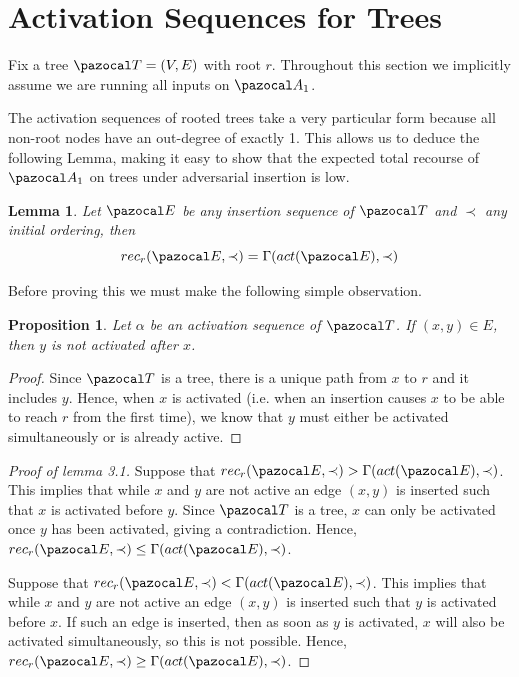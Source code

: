 \documentclass{report}
\newtheorem{lemma}[theorem]{Lemma}
\newtheorem{proposition}[theorem]{Proposition}
\begin{document}
\section{Activation Sequences for Trees}

Fix a tree $\pazocal T=(V,E)$ with root $r$. Throughout this section we implicitly assume we are running all inputs on $\pazocal A_1$.

The activation sequences of rooted trees take a very particular form because all non-root nodes have an out-degree of exactly 1. This allows us to deduce the following Lemma, making it easy to show that the expected total recourse of $\pazocal A_1$ on trees under adversarial insertion is low.

\begin{lemma}\label{gamma lemma 2}
Let $\pazocal E$ be any insertion sequence of $\pazocal T$ and $\prec$ any initial ordering, then
\[ rec_r(\pazocal E, \prec) = \Gamma(act(\pazocal E), \prec) \]
\end{lemma}

Before proving this we must make the following simple observation.

\begin{proposition}
Let $\alpha$ be an activation sequence of $\pazocal T$. If $(x,y) \in E$, then $y$ is not activated after $x$.
\end{proposition}

\begin{proof}
Since $\pazocal T$ is a tree, there is a unique path from $x$ to $r$ and it includes $y$. Hence, when $x$ is activated (i.e. when an insertion causes $x$ to be able to reach $r$ from the first time), we know that $y$ must either be activated simultaneously or is already active.
\end{proof}

\begin{proof}[Proof of lemma 3.1]
Suppose that $rec_r(\pazocal E, \prec) > \Gamma(act(\pazocal E), \prec)$. This implies that while $x$ and $y$ are not active an edge $(x,y)$ is inserted such that $x$ is activated before $y$. Since $\pazocal T$ is a tree, $x$ can only be activated once $y$ has been activated, giving a contradiction. Hence, $rec_r(\pazocal E, \prec) \leq \Gamma(act(\pazocal E), \prec)$.

Suppose that $rec_r(\pazocal E, \prec) < \Gamma(act(\pazocal E), \prec)$. This implies that while $x$ and $y$ are not active an edge $(x,y)$ is inserted such that $y$ is activated before $x$. If such an edge is inserted, then as soon as $y$ is activated, $x$ will also be activated simultaneously, so this is not possible. Hence, $rec_r(\pazocal E, \prec) \geq \Gamma(act(\pazocal E), \prec)$.
\end{proof}
\end{document}
